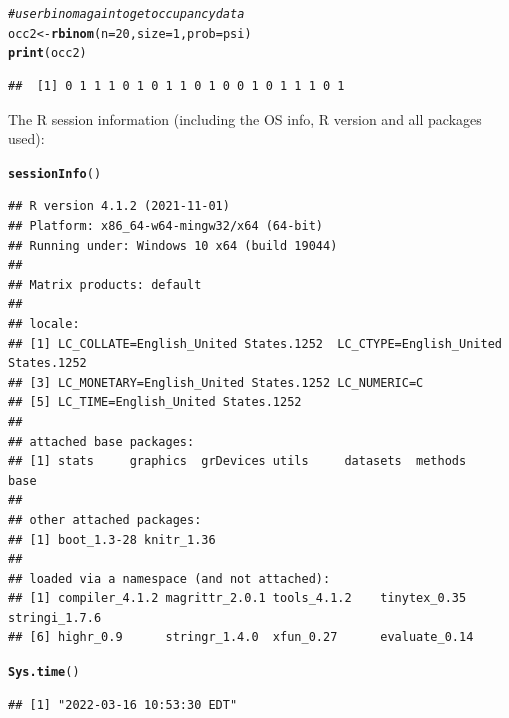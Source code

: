\documentclass{article}\usepackage[]{graphicx}\usepackage[]{color}
\makeatletter
\newcommand{\hlnum}[1]{\textcolor[rgb]{0.686,0.059,0.569}{#1}}%
\newcommand{\hlcom}[1]{\textcolor[rgb]{0.678,0.584,0.686}{\textit{#1}}}%
\newcommand{\hlstd}[1]{\textcolor[rgb]{0.345,0.345,0.345}{#1}}%
\newcommand{\hlkwb}[1]{\textcolor[rgb]{0.69,0.353,0.396}{#1}}%
\newcommand{\hlkwc}[1]{\textcolor[rgb]{0.333,0.667,0.333}{#1}}%
\newcommand{\hlkwd}[1]{\textcolor[rgb]{0.737,0.353,0.396}{\textbf{#1}}}%
\newenvironment{kframe}{%
 \def\at@end@of@kframe{}%
 \ifinner\ifhmode%
  \def\at@end@of@kframe{\end{minipage}}%
  \begin{minipage}{\columnwidth}%
 \fi\fi%
 \def\FrameCommand##1{\hskip\@totalleftmargin \hskip-\fboxsep
 \colorbox{shadecolor}{##1}\hskip-\fboxsep
     \hskip-\linewidth \hskip-\@totalleftmargin \hskip\columnwidth}%
 \MakeFramed {\advance\hsize-\width
   \@totalleftmargin\z@ \linewidth\hsize
   \@setminipage}}%
 {\par\unskip\endMakeFramed%
 \at@end@of@kframe}
\newenvironment{knitrout}{}{} %
\makeatother
\begin{document}
\begin{knitrout}
{}


\begin{kframe}\begin{alltt}
\hlcom{# use rbinom again to get occupancy data}
\hlstd{occ2} \hlkwb{<-} \hlkwd{rbinom}\hlstd{(}\hlkwc{n} \hlstd{=} \hlnum{20}\hlstd{,} \hlkwc{size} \hlstd{=} \hlnum{1}\hlstd{,} \hlkwc{prob} \hlstd{= psi)}
\hlkwd{print}\hlstd{(occ2)}
\end{alltt}
\begin{verbatim}
##  [1] 0 1 1 1 0 1 0 1 1 0 1 0 0 1 0 1 1 1 0 1
\end{verbatim}
\end{kframe}
\end{knitrout}

The R session information (including the OS info, R version and all
packages used):

\begin{knitrout}
\color{fgcolor}\begin{kframe}
\begin{alltt}
\hlkwd{sessionInfo}\hlstd{()}
\end{alltt}
\begin{verbatim}
## R version 4.1.2 (2021-11-01)
## Platform: x86_64-w64-mingw32/x64 (64-bit)
## Running under: Windows 10 x64 (build 19044)
## 
## Matrix products: default
## 
## locale:
## [1] LC_COLLATE=English_United States.1252  LC_CTYPE=English_United States.1252   
## [3] LC_MONETARY=English_United States.1252 LC_NUMERIC=C                          
## [5] LC_TIME=English_United States.1252    
## 
## attached base packages:
## [1] stats     graphics  grDevices utils     datasets  methods   base     
## 
## other attached packages:
## [1] boot_1.3-28 knitr_1.36 
## 
## loaded via a namespace (and not attached):
## [1] compiler_4.1.2 magrittr_2.0.1 tools_4.1.2    tinytex_0.35   stringi_1.7.6 
## [6] highr_0.9      stringr_1.4.0  xfun_0.27      evaluate_0.14
\end{verbatim}
\begin{alltt}
\hlkwd{Sys.time}\hlstd{()}
\end{alltt}
\begin{verbatim}
## [1] "2022-03-16 10:53:30 EDT"
\end{verbatim}
\end{kframe}
\end{knitrout}
\end{document}
